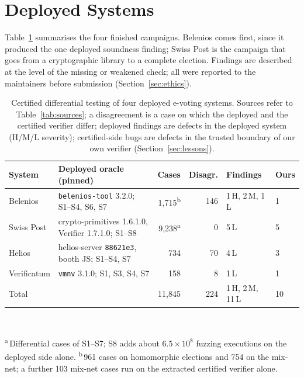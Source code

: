 \section{Deployed Systems}\label{sec:casestudies}
Table~\ref{tab:summary} summarises the four finished campaigns. Belenios
comes first, since it produced the one deployed soundness finding; Swiss
Post is the campaign that goes from a cryptographic library to a complete
election. Findings are described at the level of the missing or weakened
check; all were reported to the maintainers before submission
(Section~\ref{sec:ethics}).

\begin{table}[t]
  \caption{Certified differential testing of four deployed e-voting
  systems. Sources refer to Table~\ref{tab:sources}; a disagreement is a
  case on which the deployed and the certified verifier differ; deployed
  findings are defects in the deployed system (H/M/L severity);
  certified-side bugs are defects in the trusted boundary of our own
  verifier (Section~\ref{sec:lessons}).}
  \label{tab:summary}
  \centering\scriptsize\setlength{\tabcolsep}{3pt}
  \begin{tabularx}{\columnwidth}{@{}l>{\raggedright\arraybackslash}Xrrll@{}}
    \toprule
    System & Deployed oracle (pinned) & Cases & Disagr. & Findings & Ours \\
    \midrule
    Belenios & \texttt{belenios-tool} 3.2.0; S1--S4, S6, S7 & 1{,}715\textsuperscript{b} & 146 & 1\,H, 2\,M, 1\,L & 1 \\
    Swiss Post & crypto-primitives 1.6.1.0, Verifier 1.7.1.0; S1--S8 & 9{,}238\textsuperscript{a} & 0 & 5\,L & 5 \\
    Helios & helios-server \texttt{88621e3}, booth JS; S1--S4, S7 & 734 & 70 & 4\,L & 3 \\
    Verificatum & \texttt{vmnv} 3.1.0; S1, S3, S4, S7 & 158 & 8 & 1\,L & 1 \\
    \midrule
    Total & & 11{,}845 & 224 & 1\,H, 2\,M, 11\,L & 10 \\
    \bottomrule
  \end{tabularx}\\[2pt]
  \raggedright\scriptsize
  \textsuperscript{a}\,Differential cases of S1--S7; S8 adds about $6.5\times10^{8}$ fuzzing executions on the deployed side alone.
  \textsuperscript{b}\,961 cases on homomorphic elections and 754 on the mix-net; a further 103 mix-net cases run on the extracted certified verifier alone.
\end{table}

